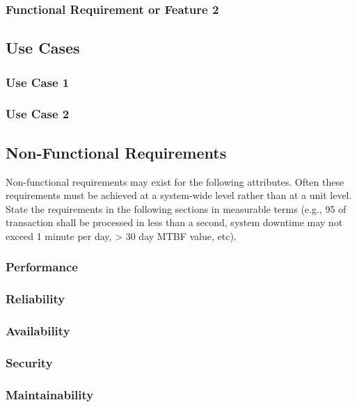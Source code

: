 \documentclass[titlepage]{article}
\begin{document}
\subsubsection{Functional Requirement or Feature 2}

\subsection{Use Cases}

\subsubsection{Use Case 1}

\subsubsection{Use Case 2}

\subsection{Non-Functional Requirements}
Non-functional requirements may exist for the following attributes.  Often these requirements must be achieved at a system-wide level rather than at a unit level.  State the requirements in the following sections in measurable terms (e.g., 95 of transaction shall be processed in less than a second, system downtime may not exceed 1 minute per day, > 30 day MTBF value, etc). 

\subsubsection{Performance}

\subsubsection{Reliability}

\subsubsection{Availability}

\subsubsection{Security}

\subsubsection{Maintainability}
\end{document}
